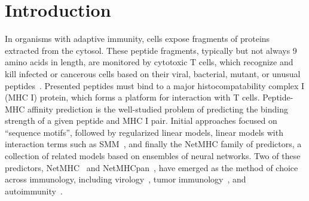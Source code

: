 \section{Introduction}
In organisms with adaptive immunity, cells expose fragments of proteins extracted from the cytosol. These peptide fragments, typically but not always 9 amino acids in length, are monitored by cytotoxic T cells, which recognize and kill infected or cancerous cells based on their viral, bacterial, mutant, or unusual peptides~\cite{Anderson_2004}. Presented peptides must bind to a major histocompatability complex I (MHC I) protein, which forms a platform for interaction with T cells. Peptide-MHC affinity prediction is the well-studied problem of predicting the binding strength of a given peptide and MHC I pair\cite{Lundegaard_2007}. Initial approaches focused on ``sequence motifs''\cite{Sette_1989}, followed by regularized linear models, linear models with interaction terms such as SMM~\cite{Peters_2003}, and finally the NetMHC family of predictors, a collection of related models based on ensembles of neural networks. Two of these predictors, NetMHC~\cite{Lundegaard_2008} and NetMHCpan~\cite{Nielsen_2007}, have emerged as the method of choice across immunology, including virology~\cite{Lund_2011}, tumor immunology~\cite{Gubin_2015}, and autoimmunity~\cite{Abreu_2012}. 





